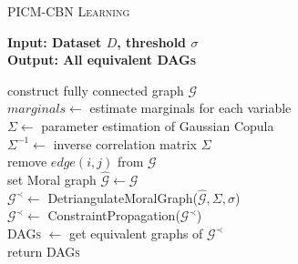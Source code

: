 \begin{algorithm}[H]
\caption{\textsc{PICM-CBN Learning}}
\label{algor:copbn}
\textbf{Input: Dataset $D$, threshold $\sigma$} \\
\textbf{Output: All equivalent \textsc{DAGs}}\\\vspace{-4mm}
	\begin{algorithmic}[1]
		\STATE construct fully connected graph $\mathcal{G}$\\
		\STATE $marginals \leftarrow$ estimate marginals for each variable\\
		\STATE $\Sigma \leftarrow$ parameter estimation of Gaussian Copula\\
		\STATE $\Sigma^{-1} \leftarrow$ inverse correlation matrix $\Sigma$\\
				\STATE remove $edge\left(i, j\right)$ from $\mathcal{G}$\\
			\ENDIF	
		\ENDFOR
		\STATE set Moral graph $\hat{\mathcal{G}} \leftarrow \mathcal{G}$\\	
		\STATE $\mathcal{G}^\prec \leftarrow $ DetriangulateMoralGraph($\hat{\mathcal{G}}, \Sigma, \sigma$)\\
		\STATE $\mathcal{G}^\prec \leftarrow $ ConstraintPropagation($\mathcal{G}^\prec$)\\
		\STATE \textsc{DAGs} $\leftarrow$ get equivalent graphs of $\mathcal{G}^\prec$\\
		\STATE return \textsc{DAGs}
	\end{algorithmic}
\end{algorithm}